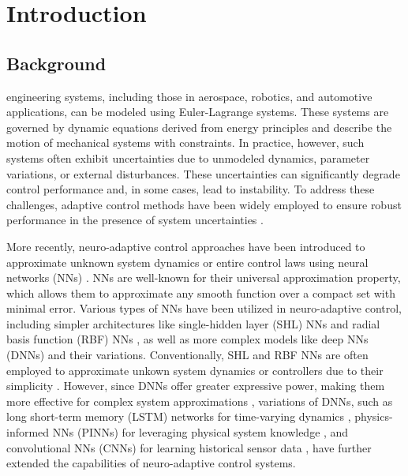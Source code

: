 \documentclass[journal]{IEEEtran}
\begin{document}
\section{Introduction}

\subsection{Background}

 engineering systems, including those in aerospace, robotics, and automotive applications, can be modeled using Euler-Lagrange systems. 
These systems are governed by dynamic equations derived from energy principles and describe the motion of mechanical systems with constraints. 
In practice, however, such systems often exhibit uncertainties due to unmodeled dynamics, parameter variations, or external disturbances. 
These uncertainties can significantly degrade control performance and, in some cases, lead to instability. 
To address these challenges, adaptive control methods have been widely employed to ensure robust performance in the presence of system uncertainties \cite{Ioannou:2006aa, Tao:2003aa}.

More recently, neuro-adaptive control approaches have been introduced to approximate unknown system dynamics or entire control laws using neural networks (NNs) \cite{Lewis:1998aa,Farrell:2006aa}. 
NNs are well-known for their universal approximation property, which allows them to approximate any smooth function over a compact set with minimal error. 
Various types of NNs have been utilized in neuro-adaptive control, including simpler architectures like single-hidden layer (SHL) NNs \cite{Lewis:1996aa,Ge:2010aa, Yesildirek:1995aa} and radial basis function (RBF) NNs \cite{Liu:2013ab,Ge:2002aa}, as well as more complex models like deep NNs (DNNs) \cite{Patil:2022aa} and their variations. 
Conventionally, SHL and RBF NNs are often employed to approximate \color{red}unkown\color{black} system dynamics or controllers due to their simplicity \cite{Esfandiari:2014aa,Esfandiari:2015aa,Yesildirek:1995aa,Gao:2006aa}.
However, since DNNs offer greater expressive power, making them more effective for complex system approximations \cite{Rolnick:2018aa}, variations of DNNs, such as long short-term memory (LSTM) networks for time-varying dynamics \cite{Griffis:2023aa}, physics-informed NNs (PINNs) for leveraging physical system knowledge \cite{Hart:2024aa}, and convolutional NNs (CNNs) for learning historical sensor data \cite{Ryu:2024ac}, have further extended the capabilities of neuro-adaptive control systems.
\end{document}
